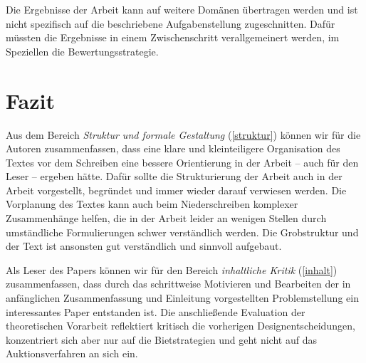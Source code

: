 \documentclass[sigconf]{acmart}
\begin{document}
Die Ergebnisse der Arbeit kann auf weitere Domänen übertragen werden und ist nicht spezifisch auf die beschriebene Aufgabenstellung zugeschnitten. Dafür müssten die Ergebnisse in einem Zwischenschritt verallgemeinert werden, im Speziellen die Bewertungsstrategie.

\section{Fazit}
\label{fazit}
Aus dem Bereich \textit{Struktur und formale Gestaltung} (\ref{struktur}) können wir für die Autoren zusammenfassen, dass eine klare und kleinteiligere Organisation des Textes vor dem Schreiben eine bessere Orientierung in der Arbeit -- auch für den Leser -- ergeben hätte. Dafür sollte die Strukturierung der Arbeit auch in der Arbeit vorgestellt, begründet und immer wieder darauf verwiesen werden. Die Vorplanung des Textes kann auch beim Niederschreiben komplexer Zusammenhänge helfen, die in der Arbeit leider an wenigen Stellen durch umständliche Formulierungen schwer verständlich werden. Die Grobstruktur und der Text ist ansonsten gut verständlich und sinnvoll aufgebaut.

Als Leser des Papers können wir für den Bereich \textit{inhaltliche Kritik} (\ref{inhalt}) zusammenfassen, dass durch das schrittweise Motivieren und Bearbeiten der in anfänglichen Zusammenfassung und Einleitung vorgestellten  Problemstellung ein interessantes Paper entstanden ist. Die anschließende Evaluation der theoretischen Vorarbeit reflektiert kritisch die vorherigen Designentscheidungen, konzentriert sich aber nur auf die Bietstrategien und geht nicht auf das Auktionsverfahren an sich ein.
\end{document}
